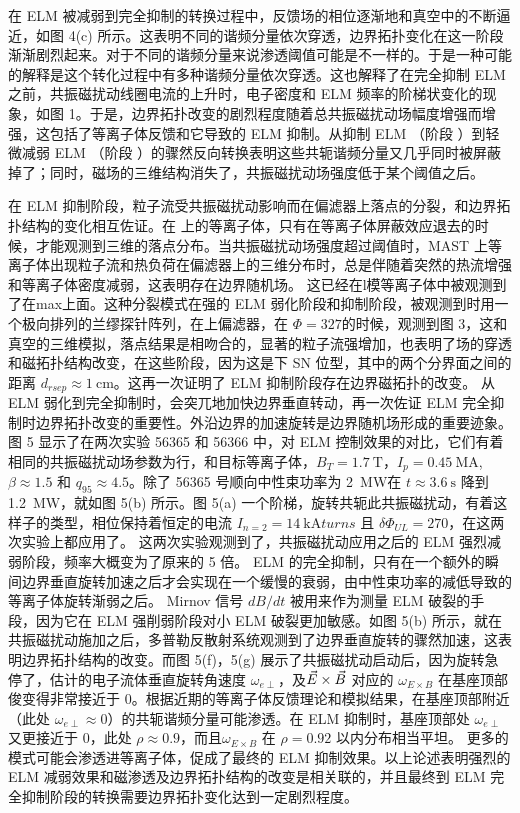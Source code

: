 在 ELM 被减弱到完全抑制的转换过程中，反馈场的相位逐渐地和真空中的不断逼近，如图 4(c) 所示。这表明不同的谐频分量依次穿透，边界拓扑变化在这一阶段渐渐剧烈起来。对于不同的谐频分量来说渗透阈值可能是不一样的。于是一种可能的解释是这个转化过程中有多种谐频分量依次穿透。这也解释了在完全抑制 ELM 之前，共振磁扰动线圈电流的上升时，电子密度和 ELM 频率的阶梯状变化的现象，如图 1。于是，边界拓扑改变的剧烈程度随着总共振磁扰动场幅度增强而增强，这包括了等离子体反馈和它导致的 ELM 抑制。从抑制 ELM （阶段 ）到轻微减弱 ELM （阶段 ）的骤然反向转换表明这些共轭谐频分量又几乎同时被屏蔽掉了；同时，磁场的三维结构消失了，共振磁扰动场强度低于某个阈值之后。

在 ELM 抑制阶段，粒子流受共振磁扰动影响而在偏滤器上落点的分裂，和边界拓扑结构的变化相互佐证。在 \ddd 上的\Lmode 等离子体，只有在等离子体屏蔽效应退去的时候，才能观测到三维的落点分布。当共振磁扰动场强度超过阈值时，MAST 上\Lmode 等离子体出现粒子流和热负荷在偏滤器上的三维分布时，总是伴随着突然的热流增强和等离子体密度减弱，这表明存在边界随机场。
这已经在l模等离子体中被观测到了在max上面。这种分裂模式在强的 ELM 弱化阶段和抑制阶段，被观测到时用一个极向排列的兰缪探针阵列，在上偏滤器，在 $\Phi =327$\degree 的时候，观测到图 3，这和真空的三维模拟，落点结果是相吻合的，显著的粒子流强增加，也表明了场的穿透和磁拓扑结构改变，在这些阶段，因为这是下 SN 位型，其中的两个分界面之间的距离 $d_{rsep}\approx \SI{1}{\centi\metre}$。这再一次证明了 ELM 抑制阶段存在边界磁拓扑的改变。
从 ELM 弱化到完全抑制时，会突兀地加快边界垂直转动，再一次佐证 ELM 完全抑制时边界拓扑改变的重要性。外沿边界的加速旋转是边界随机场形成的重要迹象。图 5 显示了在两次实验 56365 和 56366 中，对 ELM 控制效果的对比，它们有着相同的共振磁扰动场参数为行，和目标等离子体，$B_T=\SI{1.7}{\tesla}$，$I_p=\SI{0.45}{\mega\ampere}$, $\beta\approx 1.5$ 和 $q_{95}\approx 4.5$。除了 56365 号顺向中性束功率为 \SI{2}{\mega\watt}在 $t\approx \SI{3.6}{\second}$ 降到 \SI{1.2}{\mega\watt}，就如图 5(b) 所示。图 5(a) 一个阶梯，旋转共轭此共振磁扰动，有着这样子的类型，相位保持着恒定的电流 $I_{n=2}=\SI{14}{\kilo\ampere turns}$ 且 $\delta\Phi_{UL}=270$\degree，在这两次实验上都应用了。
这两次实验观测到了，共振磁扰动应用之后的 ELM 强烈减弱阶段，频率大概变为了原来的 5 倍。 ELM 的完全抑制，只有在一个额外的瞬间边界垂直旋转加速之后才会实现在一个缓慢的衰弱，由中性束功率的减低导致的等离子体旋转渐弱之后。 Mirnov 信号 $dB/dt$ 被用来作为测量 ELM 破裂的手段，因为它在 ELM 强削弱阶段对小 ELM 破裂更加敏感。如图 5(b) 所示，就在共振磁扰动施加之后，多普勒反散射系统观测到了边界垂直旋转的骤然加速，这表明边界拓扑结构的改变。而图 5(f)，5(g) 展示了共振磁扰动启动后，因为旋转急停了，估计的电子流体垂直旋转角速度 $\omega_{e\perp}$，及$\vec{E}\times\vec{B}$ 对应的 $\omega_{E\times B}$ 在基座顶部俊变得非常接近于 0。根据近期的等离子体反馈理论和模拟结果，在基座顶部附近（此处 $\omega_{e\perp}\approx 0$）的共轭谐频分量可能渗透。在 ELM 抑制时，基座顶部处 $\omega_{e\perp}$ 又更接近于 0，此处 $\rho \approx 0.9$，而且$\omega_{E\times B}$ 在 $\rho=0.92$ 以内分布相当平坦。
更多的模式可能会渗透进等离子体，促成了最终的 ELM 抑制效果。以上论述表明强烈的 ELM 减弱效果和磁渗透及边界拓扑结构的改变是相关联的，并且最终到 ELM 完全抑制阶段的转换需要边界拓扑变化达到一定剧烈程度。

